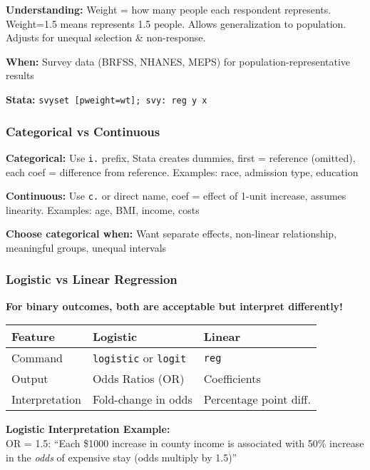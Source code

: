 ﻿\documentclass[8pt,letterpaper]{article}
\begin{document}
\begin{multicols}{2}
\textbf{Understanding:} Weight = how many people each respondent represents. Weight=1.5 means represents 1.5 people. Allows generalization to population. Adjusts for unequal selection \& non-response.

\textbf{When:} Survey data (BRFSS, NHANES, MEPS) for population-representative results

\textbf{Stata:} \texttt{svyset [pweight=wt]; svy: reg y x}

\subsubsection{Categorical vs Continuous}

\textbf{Categorical:} Use \texttt{i.} prefix, Stata creates dummies, first = reference (omitted), each coef = difference from reference. Examples: race, admission type, education

\textbf{Continuous:} Use \texttt{c.} or direct name, coef = effect of 1-unit increase, assumes linearity. Examples: age, BMI, income, costs

\textbf{Choose categorical when:} Want separate effects, non-linear relationship, meaningful groups, unequal intervals

\subsubsection{Logistic vs Linear Regression}

\textbf{For binary outcomes, both are acceptable but interpret differently!}

\begin{center}
\fontsize{6.5pt}{7.5pt}\selectfont
\begin{tabular}{|p{2.2cm}|p{2.4cm}|p{2.4cm}|}
\hline
\textbf{Feature} & \textbf{Logistic} & \textbf{Linear} \\
\hline
Command & \texttt{logistic} or \texttt{logit} & \texttt{reg} \\
\hline
Output & Odds Ratios (OR) & Coefficients \\
\hline
Interpretation & Fold-change in odds & Percentage point diff. \\
\hline
\end{tabular}
\end{center}

\textbf{Logistic Interpretation Example:}\\
OR = 1.5: ``Each \$1000 increase in county income is associated with 50\% increase in the \textit{odds} of expensive stay (odds multiply by 1.5)''


\end{multicols}
\end{document}
